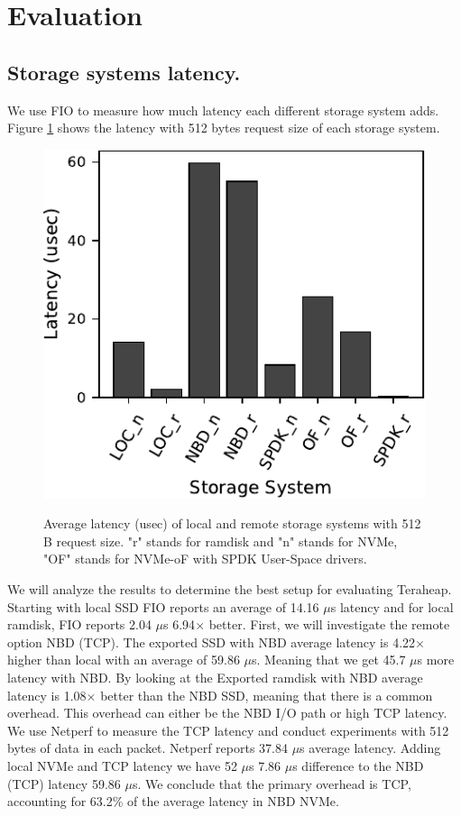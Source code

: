 \section{Evaluation}
\subsection{Storage systems latency.}
We use FIO to measure how much latency each different storage system adds.
Figure \ref{fig:fio_512} shows the latency with 512 bytes request size
of each storage system.

\begin{figure}[H]
  \includegraphics[width=\linewidth]{figures/fio_512.pdf}\\
\caption{Average latency (usec) of local and remote storage systems with 512 B request size. "r" stands for ramdisk and "n" stands for NVMe, "OF" stands for NVMe-oF with SPDK User-Space drivers.}
\label{fig:fio_512}
\end{figure}

We will analyze the results to determine the best setup for evaluating Teraheap. Starting with local SSD FIO reports an average of 14.16 $\mu$s latency and for local ramdisk, FIO reports 2.04 $\mu$s 6.94$\times$ better. First, we will investigate the remote option NBD (TCP). The exported SSD with NBD average latency is 4.22$\times$ higher than local with an average of 59.86 $\mu$s. Meaning that we get 45.7 $\mu$s more latency with NBD. By looking at the Exported ramdisk with NBD average latency is 1.08$\times$ better than the NBD SSD, meaning that there is a common overhead. This overhead can either be the NBD I/O path or high TCP latency. We use Netperf to measure the TCP latency and conduct experiments with 512 bytes of data in each packet. Netperf reports 37.84 $\mu$s average
latency. Adding local NVMe and TCP latency we have 52 $\mu$s 7.86 $\mu$s difference to the NBD
(TCP) latency 59.86 $\mu$s. We conclude that the primary overhead is TCP, accounting for 63.2\% of the average latency in NBD NVMe.

